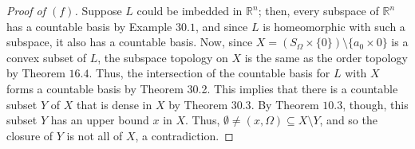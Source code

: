 \documentclass[12pt]{article}
\theoremstyle{remark}
\begin{document}
\begin{proof}[Proof of $(f)$]
  Suppose $L$ could be imbedded in $\mathbb{R}^n$; then, every subspace of $\mathbb{R}^n$ has a countable basis by Example $30.1$, and since $L$ is homeomorphic with such a subspace, it also has a countable basis. Now, since $X = (S_\Omega \times \{0\}) \setminus \{a_0 \times 0\}$ is a convex subset of $L$, the subspace topology on $X$ is the same as the order topology by Theorem $16.4$. Thus, the intersection of the countable basis for $L$ with $X$ forms a countable basis by Theorem 30.2. This implies that there is a countable subset $Y$ of $X$ that is dense in $X$ by Theorem $30.3$. By Theorem $10.3$, though, this subset $Y$ has an upper bound $x$ in $X$. Thus, $\emptyset \ne (x,\Omega) \subseteq X \setminus Y$, and so the closure of $Y$ is not all of $X$, a contradiction.
\end{proof}
\end{document}

